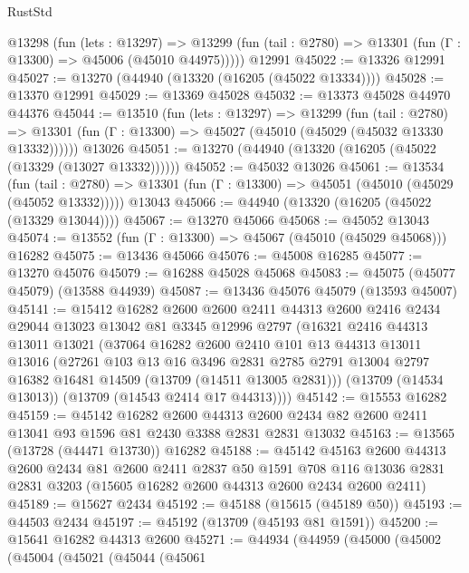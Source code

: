 \begin{lexlean}{RustStd}
\begin{coremodule}
    @13298
      (fun (lets : @13297) =>
      @13299 (fun (tail : @2780) => @13301 (fun (Γ : @13300) => @45006 (@45010 @44975)))))
    @12991
@45022 := @13326 @12991
@45027 := @13270 (@44940 (@13320 (@16205 (@45022 @13334))))
@45028 := @13370 @12991
@45029 := @13369 @45028
@45032 := @13373 @45028 @44970 @44376
@45044 := @13510
    (fun (lets : @13297) =>
    @13299
      (fun (tail : @2780) =>
      @13301 (fun (Γ : @13300) => @45027 (@45010 (@45029 (@45032 @13330 @13332))))))
    @13026
@45051 := @13270 (@44940 (@13320 (@16205 (@45022 (@13329 (@13027 @13332))))))
@45052 := @45032 @13026
@45061 := @13534
    (fun (tail : @2780) => @13301 (fun (Γ : @13300) => @45051 (@45010 (@45029 (@45052 @13332)))))
    @13043
@45066 := @44940 (@13320 (@16205 (@45022 (@13329 @13044))))
@45067 := @13270 @45066
@45068 := @45052 @13043
@45074 := @13552 (fun (Γ : @13300) => @45067 (@45010 (@45029 @45068))) @16282
@45075 := @13436 @45066
@45076 := @45008 @16285
@45077 := @13270 @45076
@45079 := @16288 @45028 @45068
@45083 := @45075 (@45077 @45079) (@13588 @44939)
@45087 := @13436 @45076 @45079 (@13593 @45007)
@45141 := @15412
    @16282
    @2600
    @2600
    @2411
    @44313
    @2600
    @2416
    @2434
    @29044
    @13023
    @13042
    @81
    @3345
    @12996
    @2797
    (@16321
      @2416
      @44313
      @13011
      @13021
      (@37064
        @16282
        @2600
        @2410
        @101
        @13
        @44313
        @13011
        @13016
        (@27261
          @103
          @13
          @16
          @3496
          @2831
          @2785
          @2791
          @13004
          @2797
          @16382
          @16481
          @14509
          (@13709 (@14511 @13005 @2831)))
        (@13709 (@14534 @13013))
        (@13709 (@14543 @2414 @17 @44313))))
@45142 := @15553 @16282
@45159 := @45142
    @16282
    @2600
    @44313
    @2600
    @2434
    @82
    @2600
    @2411
    @13041
    @93
    @1596
    @81
    @2430
    @3388
    @2831
    @2831
    @13032
@45163 := @13565 (@13728 (@44471 @13730)) @16282
@45188 := @45142
    @45163
    @2600
    @44313
    @2600
    @2434
    @81
    @2600
    @2411
    @2837
    @50
    @1591
    @708
    @116
    @13036
    @2831
    @2831
    @3203
    (@15605 @16282 @2600 @44313 @2600 @2434 @2600 @2411)
@45189 := @15627 @2434
@45192 := @45188 (@15615 (@45189 @50))
@45193 := @44503 @2434
@45197 := @45192 (@13709 (@45193 @81 @1591))
@45200 := @15641 @16282 @44313 @2600
@45271 := @44934
    (@44959
      (@45000
        (@45002
          (@45004
            (@45021
              (@45044
                (@45061

\end{coremodule}
\end{lexlean}
